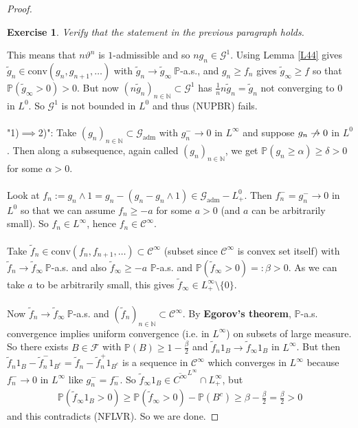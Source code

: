 \documentclass[12pt,a4paper, twoside]{article}
\newtheorem{exe}{Exercise}[section]
\theoremstyle{definition}
\newcommand{\PP}{\mathbb{P}} %
\begin{document}
\begin{proof}
\begin{exe} \label{ex14} Verify that the statement in the previous paragraph holds.
\end{exe}
\noindent This means that $n \vartheta^n$ is $1$-admissible and so $n g_n \in \mathcal{G}^1$. Using Lemma \ref{L44} gives $\widetilde{g}_n \in \text{conv}(g_n, g_{n+1}, \dots )$ with $\widetilde{g}_n \to \widetilde{g}_\infty \ \PP$-a.s., and $g_n \geq f_n$ gives $\widetilde{g}_\infty \geq f$ so that $\PP( \widetilde{g}_\infty > 0)>0$. But now $(n \widetilde{g}_n)_{n \in \mathbb{N}} \subset \mathcal{G}^1$ has $\frac{1}{n}n \widetilde{g}_n = \widetilde{g}_n$ not converging to $0$ in $L^0$. So $\mathcal{G}^1$ is not bounded in $L^0$ and thus (NUPBR) fails. 
\\\\
"1)$\implies$2)": Take $(g_n)_{n \in \mathbb{N}} \subset \mathcal{G}_\text{adm}$ with $g_n^- \to 0$ in $L^\infty$ and suppose $g_n \centernot\to 0$ in $L^0$. Then along a subsequence, again called $(g_n)_{n \in \mathbb{N}}$, we get $\PP( g_n \geq \alpha) \geq \delta >0$ for some $\alpha >0$. \\\\
Look at $f_n:= g_n \wedge 1 = g_n-(g_n-g_n \wedge 1) \in \mathcal{G}_\text{adm}-L_+^0$. Then $f_n^- = g_n^- \to 0$ in $L^0$ so that we can assume $f_n \geq - a$ for some $a >0$ (and $a$ can be arbitrarily small). So $f_n \in L^\infty$, hence $f_n \in \mathcal{C}^\infty$. \\
\\
Take $\widetilde{f}_n \in \text{conv}(f_n, f_{n+1}, \dots ) \subset \mathcal{C}^\infty$ (subset since $\mathcal{C}^\infty$ is convex set itself) with $\widetilde{f}_n \to \widetilde{f}_\infty \ \PP$-a.s. and also $\widetilde{f}_\infty \geq -a $ $\PP$-a.s. and $\PP( \widetilde{f}_\infty >0)=: \beta >0$. As we can take $a$ to be arbitrarily small, this gives $\widetilde{f}_\infty \in L_+^\infty \setminus \{0\}$. \\
\\
Now $\widetilde{f}_n \to \widetilde{f}_\infty \ \PP$-a.s. and $(\widetilde{f}_n)_{n \in \mathbb{N}} \subset \mathcal{C}^\infty$. By \textbf{Egorov's theorem}, $\PP$-a.s. convergence implies uniform convergence (i.e. in $L^\infty$) on subsets of large measure. So there exists $B \in \mathcal{F}$ with $\PP(B) \geq 1- \frac{\beta}{2}$ and $\widetilde{f}_n 1_B \to \widetilde{f}_\infty 1_B$ in $L^\infty$. But then $\widetilde{f}_n 1_B - \widetilde{f}_n^- 1_{B^c}= \widetilde{f}_n-\widetilde{f}_n^+ 1_{B^c}$ is a sequence in $\mathcal{C}^\infty$ which converges in $L^\infty$ because $f_n^- \to 0$ in $L^\infty$ like $g_n^-=f_n^-$.  So $\widetilde{f}_\infty 1_B \in \overline{C^\infty}^{L^\infty} \cap L_+^\infty$, but 
\begin{align*}
\PP( \widetilde{f}_\infty 1_B > 0) \geq \PP( \widetilde{f}_\infty >0)- \PP(B^c) \geq \beta - \frac{\beta}{2}= \frac{\beta}{2} >0
\end{align*}
and this contradicts (NFLVR). So we are done. 
\end{proof}
\end{document}
